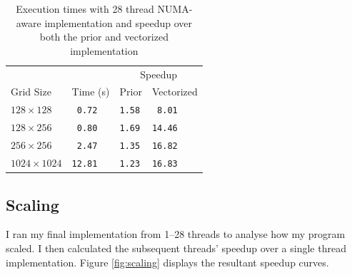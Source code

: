 \documentclass[twocolumn, a4paper]{article}
\begin{document}
\begin{table}[htbp]
  \begin{center}
  \caption{Execution times with 28 thread NUMA-aware implementation and speedup over both the prior and vectorized implementation}\label{tab:numa}
  \begin{tabular}[t]{l | l  l  l} 
      \hline\hline
      &&\multicolumn{2}{c}{Speedup}\\
      \cline{3-4}
      Grid Size&Time (s)&Prior&Vectorized\\
      \hline
      $128 \times 128$&\texttt{ 0.72}&\texttt{1.58}&\texttt{ 8.01}\\
      $128 \times 256$&\texttt{ 0.80}&\texttt{1.69}&\texttt{14.46}\\
      $256 \times 256$&\texttt{ 2.47}&\texttt{1.35}&\texttt{16.82}\\
      $1024 \times 1024$&\texttt{12.81}&\texttt{1.23}&\texttt{16.83}\\
      \hline
    \end{tabular}
  \end{center}
  \vspace{-1em}
\end{table}

\subsection{Scaling}

I ran my final implementation from 1--28 threads to analyse how my program scaled.
I then calculated the subsequent threads' speedup over a single thread implementation.
Figure \ref{fig:scaling} displays the resultant speedup curves.
\end{document}
